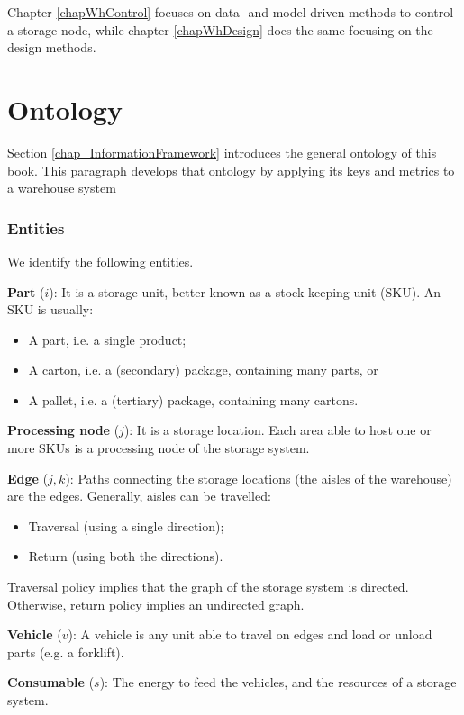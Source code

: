 Chapter \ref{chapWhControl} focuses on data- and model-driven methods to control a storage node, while chapter \ref{chapWhDesign} does the same focusing on the design methods.

\section{Ontology} \label{secOntology_wh}
Section \ref{chap_InformationFramework} introduces the general ontology of this book. This paragraph develops that ontology by applying its keys and metrics to a warehouse system

\subsubsection{Entities}
We identify the following entities.\par
\textbf{Part} ($i$): It is a storage unit, better known as a stock keeping unit (SKU). An SKU is usually:
\begin{itemize}
    \item A part, i.e. a single product;
    \item A carton, i.e. a (secondary) package, containing many parts, or 
    \item A pallet, i.e. a (tertiary) package, containing many cartons.
\end{itemize}
\par

\textbf{Processing node} ($j$): It is a storage location. Each area able to host one or more SKUs is a processing node of the storage system. \par

\textbf{Edge} ($j,k$): Paths connecting the storage locations (the aisles of the warehouse) are the edges. Generally, aisles can be travelled:
\begin{itemize}
    \item Traversal (using a single direction);
    \item Return (using both the directions).
\end{itemize}
Traversal policy implies that the graph of the storage system is directed. Otherwise, return policy implies an undirected graph.
\par

\textbf{Vehicle} ($v$): A vehicle is any unit able to travel on edges and load or unload parts (e.g. a forklift). \par

\textbf{Consumable} ($s$): The energy to feed the vehicles, and the resources of a storage system.\par

